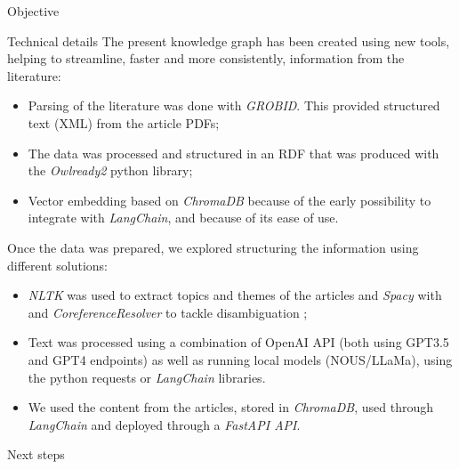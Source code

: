 \documentclass[final]{beamer}
\newlength{\onecolwid}
\begin{document}
\begin{columns}[t]
\begin{column}{\onecolwid}
\begin{block}{Objective}
          \end{block}
         \begin{block}{Technical details}
          The present knowledge graph has been created using new tools, helping to streamline, faster and more consistently, information from the literature:
           \begin{itemize}
            \item Parsing of the literature was done with \textit{GROBID}. This provided structured text (XML) from the article PDFs;
            \item The data was processed and structured in an RDF that was produced with the \textit{Owlready2} python library;
            \item Vector embedding based on \textit{ChromaDB} because of the early possibility to integrate with \textit{LangChain}, and because of its ease of use.
            
 \end{itemize}
Once the data was prepared, we explored structuring the information using different solutions:
           \begin{itemize}
\item \textit{NLTK} was used to extract topics and themes of the articles and \textit{Spacy} with and \textit{CoreferenceResolver} to tackle disambiguation ;
\item Text was processed using a combination of OpenAI API (both using GPT3.5 and GPT4 endpoints) as well as running local models (NOUS/LLaMa), using the python requests or \textit{LangChain} libraries.
\item We used the content from the articles, stored in \textit{ChromaDB}, used through \textit{LangChain} and deployed through a \textit{FastAPI API}.
                     \end{itemize}

                               \end{block}
          
          
          \begin{block}{Next steps}
          

\end{block}
\end{column}
\end{columns}
\end{document}
